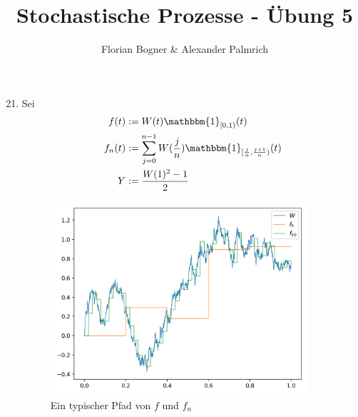\documentclass[a4paper,11pt,notitlepage,fullpage]{article}
\newcommand{\indd}[1]{\mathbbm{1}_{#1}}
\begin{document}
\author{Florian Bogner \& Alexander Palmrich}
\title{Stochastische Prozesse - Übung 5}
\maketitle

\begin{enumerate}
\setcounter{enumi}{20}

\item Sei 
\begin{align*}
f(t) &:= W(t) \indd{[0,1)}(t)\\
f_n(t) &:= \sum_{j=0}^{n-1} W(\frac{j}{n}) \indd{[\frac{j}{n}, \frac{j+1}{n})}(t)\\
Y &:= \frac{W(1)^2-1}{2}
\end{align*}

\begin{figure}[h!]
\centering
\includegraphics[width=0.9\textwidth]{gfx/21_fig.png}
\caption{Ein typischer Pfad von $f$ und $f_n$}
\end{figure}


\end{enumerate}
\end{document}
